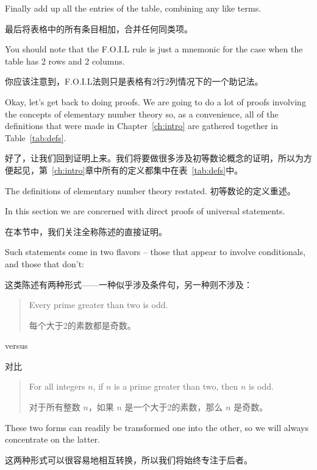 Finally add up all the entries of the table, combining any like terms.

最后将表格中的所有条目相加，合并任何同类项。

You should note that the F.O.I.L rule is just a mnemonic for the case when 
the table has 2 rows and 2 columns.

你应该注意到，F.O.I.L法则只是表格有2行2列情况下的一个助记法。

Okay, let's get back to doing proofs.  We are going to do a lot of
proofs involving the concepts of elementary number theory so, as a 
convenience, all of the definitions that were made in Chapter~\ref{ch:intro}
are gathered together in Table~\ref{tab:defs}.

好了，让我们回到证明上来。我们将要做很多涉及初等数论概念的证明，所以为方便起见，第~\ref{ch:intro}章中所有的定义都集中在表~\ref{tab:defs}中。

\begin{table}[hbt] 

\caption{The definitions of elementary number theory restated. 初等数论的定义重述。}
\label{tab:defs}
\end{table}

\clearpage 

In this section we are concerned with 
direct proofs of universal statements.

在本节中，我们关注全称陈述的直接证明。

Such statements come in two flavors -- those that appear to involve 
conditionals, and those that don't:

这类陈述有两种形式——一种似乎涉及条件句，另一种则不涉及：

\begin{quote} Every prime greater than two is odd.

每个大于2的素数都是奇数。
\end{quote}

versus

对比

\begin{quote} For all integers $n$, if $n$ is a prime greater than two, then $n$ is odd.

对于所有整数 $n$，如果 $n$ 是一个大于2的素数，那么 $n$ 是奇数。
\end{quote}

These two forms can readily be transformed one into the other, so 
we will always concentrate on the latter.

这两种形式可以很容易地相互转换，所以我们将始终专注于后者。

